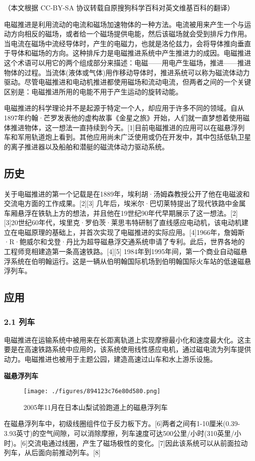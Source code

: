 
（本文根据 CC-BY-SA 协议转载自原搜狗科学百科对英文维基百科的翻译）

电磁推进是利用流动的电流和磁场加速物体的一种方法。电流被用来产生一个与运动方向相反的磁场，或者给一个磁场提供电能，然后该磁场就会受到排斥力作用。当电流在磁场中流经导体时，产生的电磁力，也就是洛伦兹力，会将导体推向垂直于导体和磁场的方向。这种排斥力是电磁推进系统中产生推进力的成因。电磁推进这个术语可以用它的两个组成部分来描述：电磁——用电产生磁场，推进——推进物体的过程。当流体(液体或气体)用作移动导体时，推进系统可以称为磁流体动力驱动。尽管电磁推进和电动机推进都使用磁场和流动电流，但两者之间的一个关键区别是：电磁推进所用的电能不用于产生运动的旋转动能。

电磁推进的科学理论并不是起源于特定一个人，却应用于许多不同的领域。自从1897年约翰·芒罗发表他的虚构故事《金星之旅》开始，人们就一直梦想着使用磁体推进物体，这一想法一直持续到今天。[1]目前电磁推进的应用可以在磁悬浮列车和军用轨道炮上看到。其他应用尚未广泛使用或仍在开发中，其中包括低轨卫星的离子推进器以及船舶和潜艇的磁流体动力驱动系统。
\subsection{历史}
关于电磁推进的第一个记载是在1889年，埃利胡·汤姆森教授公开了他在电磁波和交流电方面的工作成果。[2][3] 几年后，埃米尔·巴切莱特提出了现代铁路中金属车厢悬浮在铁轨上方的想法，并且他在19世纪90年代早期展示了这一想法。[2][3]20世纪60年代，埃里克·罗伯茨·莱思韦特研制了直线感应电动机，该电动机建立在电磁原理的基础上，并首次实现了电磁推进的实际应用。[4]1966年，詹姆斯·R·鲍威尔和戈登·丹比为超导磁悬浮交通系统申请了专利。此后，世界各地的工程师竞相建造第一条高速铁路。[4][5] 1984年到1995年间，第一个商业自动磁悬浮系统在伯明翰运行。这是一辆从伯明翰国际机场到伯明翰国际火车站的低速磁悬浮列车。
\subsection{应用}
\subsubsection{2.1 列车}
电磁推进在运输系统中被用来在长距离轨道上实现摩擦最小化和速度最大化。这主要是在高速铁路系统中应用的，该系统使用线性感应电机，通过磁电流为列车提供动力。电磁推进也被用于主题公园，建造高速过山车和水上游乐设施。

\textbf{磁悬浮列车}

\begin{figure}[ht]
\centering
\texttt{[image: ./figures/894123c76e80d580.png]}
\caption{2005年11月在日本山梨试验跑道上的磁悬浮列车} \label{fig_DCTJ_1}
\end{figure}
在磁悬浮列车中，初级线圈组件位于反力板下方。[6]两者之间有1-10厘米(0.39-3.93英寸)的空气间隙，可以消除摩擦，列车速度可达500公里/小时(310英里/小时)。[6]交流电通过线圈，产生了磁场极性的变化。[7]因此该系统可以从前面拉动列车，从后面向前推动列车。[8]

